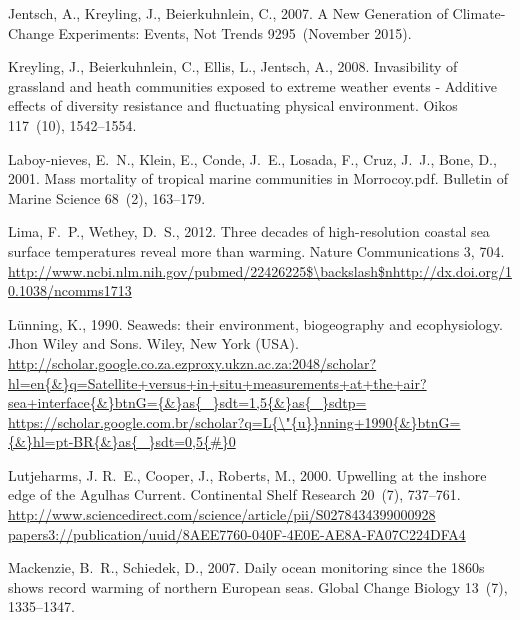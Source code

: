 \documentclass[a4paper,10pt,review]{elsarticle}
\begin{document}
\begin{thebibliography}{50}
Jentsch, A., Kreyling, J., Beierkuhnlein, C., 2007. {A New Generation of
  Climate-Change Experiments: Events, Not Trends} 9295~(November 2015).

Kreyling, J., Beierkuhnlein, C., Ellis, L., Jentsch, A., 2008. {Invasibility of
  grassland and heath communities exposed to extreme weather events - Additive
  effects of diversity resistance and fluctuating physical environment}. Oikos
  117~(10), 1542--1554.

Laboy-nieves, E.~N., Klein, E., Conde, J.~E., Losada, F., Cruz, J.~J., Bone,
  D., 2001. {Mass mortality of tropical marine communities in Morrocoy.pdf}.
  Bulletin of Marine Science 68~(2), 163--179.

Lima, F.~P., Wethey, D.~S., 2012. {Three decades of high-resolution coastal sea
  surface temperatures reveal more than warming}. Nature Communications 3, 704.
\newline\urlprefix\url{http://www.ncbi.nlm.nih.gov/pubmed/22426225$\backslash$nhttp://dx.doi.org/10.1038/ncomms1713}

L{\"{u}}nning, K., 1990. {Seaweds: their environment, biogeography and
  ecophysiology. Jhon Wiley and Sons}. Wiley, New York (USA).
\newline\urlprefix\url{http://scholar.google.co.za.ezproxy.ukzn.ac.za:2048/scholar?hl=en{\&}q=Satellite+versus+in+situ+measurements+at+the+air?sea+interface{\&}btnG={\&}as{\_}sdt=1,5{\&}as{\_}sdtp=
  https://scholar.google.com.br/scholar?q=L{\"{u}}nning+1990{\&}btnG={\&}hl=pt-BR{\&}as{\_}sdt=0,5{\#}0}

Lutjeharms, J. R.~E., Cooper, J., Roberts, M., 2000. {Upwelling at the inshore
  edge of the Agulhas Current}. Continental Shelf Research 20~(7), 737--761.
\newline\urlprefix\url{http://www.sciencedirect.com/science/article/pii/S0278434399000928
  papers3://publication/uuid/8AEE7760-040F-4E0E-AE8A-FA07C224DFA4}

Mackenzie, B.~R., Schiedek, D., 2007. {Daily ocean monitoring since the 1860s
  shows record warming of northern European seas}. Global Change Biology
  13~(7), 1335--1347.


\end{thebibliography}
\end{document}
